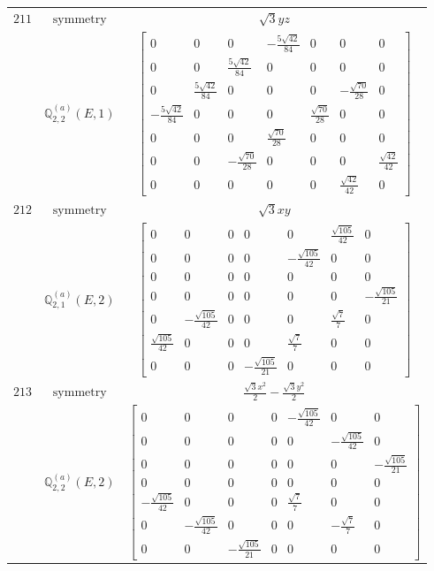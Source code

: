 \documentclass[fleqn,8pt,landscape]{jsarticle}
\begin{document}
\begin{longtable}{ccc}
$ 211 $ & $ \text{symmetry} $ & $ \sqrt{3} y z $ \\
$  $ & $ \mathbb{Q}_{2,2}^{(a)}(E,1) $ & $ \begin{bmatrix} 0 & 0 & 0 & - \frac{5 \sqrt{42}}{84} & 0 & 0 & 0 \\ 0 & 0 & \frac{5 \sqrt{42}}{84} & 0 & 0 & 0 & 0 \\ 0 & \frac{5 \sqrt{42}}{84} & 0 & 0 & 0 & - \frac{\sqrt{70}}{28} & 0 \\ - \frac{5 \sqrt{42}}{84} & 0 & 0 & 0 & \frac{\sqrt{70}}{28} & 0 & 0 \\ 0 & 0 & 0 & \frac{\sqrt{70}}{28} & 0 & 0 & 0 \\ 0 & 0 & - \frac{\sqrt{70}}{28} & 0 & 0 & 0 & \frac{\sqrt{42}}{42} \\ 0 & 0 & 0 & 0 & 0 & \frac{\sqrt{42}}{42} & 0 \end{bmatrix} $ \\ \hline
$ 212 $ & $ \text{symmetry} $ & $ \sqrt{3} x y $ \\
$  $ & $ \mathbb{Q}_{2,1}^{(a)}(E,2) $ & $ \begin{bmatrix} 0 & 0 & 0 & 0 & 0 & \frac{\sqrt{105}}{42} & 0 \\ 0 & 0 & 0 & 0 & - \frac{\sqrt{105}}{42} & 0 & 0 \\ 0 & 0 & 0 & 0 & 0 & 0 & 0 \\ 0 & 0 & 0 & 0 & 0 & 0 & - \frac{\sqrt{105}}{21} \\ 0 & - \frac{\sqrt{105}}{42} & 0 & 0 & 0 & \frac{\sqrt{7}}{7} & 0 \\ \frac{\sqrt{105}}{42} & 0 & 0 & 0 & \frac{\sqrt{7}}{7} & 0 & 0 \\ 0 & 0 & 0 & - \frac{\sqrt{105}}{21} & 0 & 0 & 0 \end{bmatrix} $ \\ \hline
$ 213 $ & $ \text{symmetry} $ & $ \frac{\sqrt{3} x^{2}}{2} - \frac{\sqrt{3} y^{2}}{2} $ \\
$  $ & $ \mathbb{Q}_{2,2}^{(a)}(E,2) $ & $ \begin{bmatrix} 0 & 0 & 0 & 0 & - \frac{\sqrt{105}}{42} & 0 & 0 \\ 0 & 0 & 0 & 0 & 0 & - \frac{\sqrt{105}}{42} & 0 \\ 0 & 0 & 0 & 0 & 0 & 0 & - \frac{\sqrt{105}}{21} \\ 0 & 0 & 0 & 0 & 0 & 0 & 0 \\ - \frac{\sqrt{105}}{42} & 0 & 0 & 0 & \frac{\sqrt{7}}{7} & 0 & 0 \\ 0 & - \frac{\sqrt{105}}{42} & 0 & 0 & 0 & - \frac{\sqrt{7}}{7} & 0 \\ 0 & 0 & - \frac{\sqrt{105}}{21} & 0 & 0 & 0 & 0 \end{bmatrix} $ \\ \hline

\end{longtable}
\end{document}
